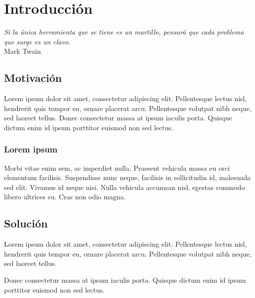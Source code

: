 
\chapter*{Introducci\'on} \label{cap0}


\begin{flushright}
\begin{minipage}{7.85cm}
    {\em Si la única herramienta que se tiene es un martillo, pensará que cada
    problema que surge es un clavo.} \\  Mark Twain
\end{minipage}
\end{flushright}

\vspace*{5mm}

\section*{Motivaci\'on}

Lorem ipsum dolor sit amet, consectetur adipiscing elit. Pellentesque lectus
nisl, hendrerit quis tempor eu, ornare placerat arcu. Pellentesque volutpat nibh
neque, sed laoreet tellus. Donec consectetur massa at ipsum iaculis porta.
Quisque dictum enim id ipsum porttitor euismod non sed lectus.

\subsection*{Lorem ipsum}

Morbi vitae enim sem, ac imperdiet nulla. Praesent vehicula massa eu orci
elementum facilisis. Suspendisse nunc neque, facilisis in sollicitudin id,
malesuada sed elit. Vivamus id neque nisi. Nulla vehicula accumsan nisl, egestas
commodo libero ultrices eu. Cras non odio magna.

\section*{Soluci\'on}

Lorem ipsum dolor sit amet, consectetur adipiscing elit. Pellentesque lectus
nisl, hendrerit quis tempor eu, ornare placerat arcu. Pellentesque volutpat nibh
neque, sed laoreet tellus.

Donec consectetur massa at ipsum iaculis porta. Quisque dictum enim id ipsum
porttitor euismod non sed lectus.

